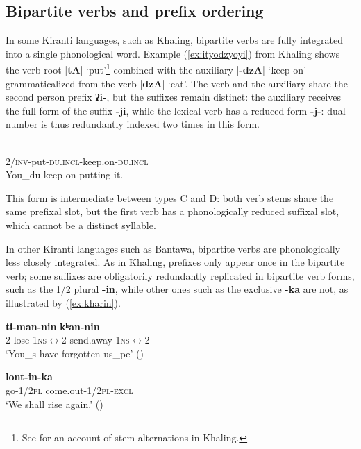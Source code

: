 \documentclass[oneside,a4paper,11pt]{article}
\newcommand{\ipa}[1]{{\phon\textbf{#1}}}
\newcommand{\dhatu}[2]{|\ipa{#1}| `#2'}
\newcommand{\refb}[1]{(\ref{#1})}
\begin{document}
\subsection{Bipartite verbs and prefix ordering}
In some Kiranti languages, such as Khaling, bipartite verbs are fully integrated into a single phonological word.  Example (\ref{ex:ityodzyoyi}) from Khaling shows the verb root \dhatu{tA}{put}\footnote{See \citet{jacques12khaling} for an account of stem alternations in Khaling.} combined with the auxiliary \dhatu{-dzA}{keep on} grammaticalized from the verb \dhatu{dzA}{eat}. The verb and the auxiliary share the second person prefix \ipa{ʔi-}, but the suffixes remain distinct: the auxiliary receives the full form of the suffix \ipa{-ji}, while the lexical verb has a reduced form \ipa{-j-}: dual number is thus redundantly indexed two times in this form.

\begin{exe}
\ex \label{ex:ityodzyoyi}
\gll \ipa{ʔi-tɵ-j-dzɵ-ji}\\
2/\textsc{inv}-put-\textsc{du.incl}-keep.on-\textsc{du.incl} \\
\glt You_{du} keep on putting it.
\end{exe}

This form is intermediate between types C and D: both verb stems share the same prefixal slot, but the first verb has a phonologically reduced suffixal slot, which cannot be a distinct syllable.

In other Kiranti languages such as Bantawa, bipartite verbs are phonologically less closely integrated. As in Khaling, prefixes only appear once in the bipartite verb; some suffixes are obligatorily redundantly replicated in bipartite verb forms, such as the 1/2 plural \ipa{-in}, while other ones such as the exclusive \ipa{-ka} are not, as illustrated by \refb{ex:kharin}. 

\begin{exe}
\ex \label{ex:timannin}
\gll
\ipa{tɨ-man-nin} \ipa{kʰan-nin} \\
2-lose-\textsc{1ns$\leftrightarrow$2} send.away-\textsc{1ns$\leftrightarrow$2} \\
\glt ‘You_s have forgotten us_{pe}’ (\citealt[168]{doornenbal09})
\end{exe}

 \begin{exe}
\ex  \label{ex:kharin}
\gll \ipa{kʰar-in} \ipa{lont-in-ka} \\
go-\textsc{1/2pl} come.out-\textsc{1/2pl-excl} \\
\glt `We shall rise again.' (\citealt[254]{doornenbal09})
\end{exe}
\end{document}
